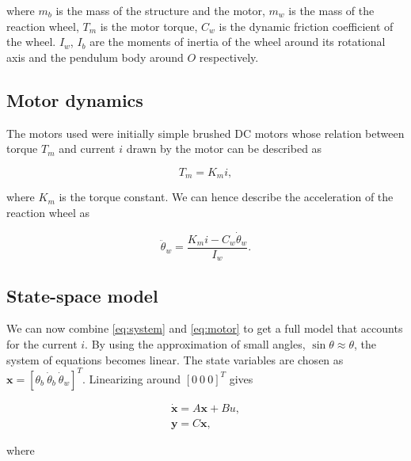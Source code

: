 \noindent
where $m_b$ is the mass of the structure and the motor, $m_w$ is the mass of the reaction wheel, $T_m$ is the motor torque, $C_w$ is the dynamic friction coefficient of the wheel. $I_w$, $I_b$ are the moments of inertia of the wheel around its rotational axis and the pendulum body around $O$ respectively.

\subsection{Motor dynamics}
The motors used were initially simple brushed DC motors whose relation between torque $T_m$ and current $i$ drawn by the motor can be described as

\begin{equation}
    T_m = K_mi,
\end{equation}

\noindent
where $K_m$ is the torque constant. We can hence describe the acceleration of the reaction wheel as

\begin{equation}\label{eq:motor}
    \ddot\theta_w = \frac{K_m i - C_w\dot\theta_w}{I_w}.
\end{equation}

\subsection{State-space model}
We can now combine \eqref{eq:system} and \eqref{eq:motor} to get a full model that accounts for the current $i$. By using the approximation of small angles, $\sin\theta \approx \theta$, the system of equations becomes linear. The state variables are chosen as $\mathbf{x} = [\theta_b \ \dot\theta_b \ \dot\theta_w]^T$. Linearizing around $[0 \ 0 \ 0]^T$ gives

\begin{equation}\label{eq:state-space}  
    \begin{gathered}
        \dot{\mathbf{x}} = A\mathbf{x} + Bu, \\
        \mathbf{y} = C\mathbf{x},
    \end{gathered}
\end{equation}

\noindent
where

